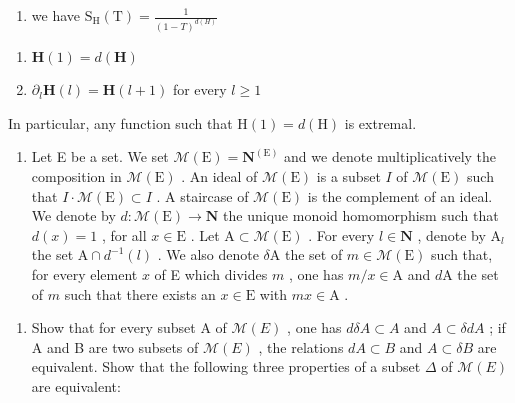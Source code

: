 \begin{enumerate}
\def\labelenumi{(\roman{enumi})}
\tightlist
\item
  we have \(\mathrm{S_H(T)} = \frac{1}{(1 - T)^{d(H)}}\)
\end{enumerate}

\begin{enumerate}
\def\labelenumi{(\roman{enumi})}
\setcounter{enumi}{1}
\item
  \(\mathbf{H}(1) = d(\mathbf{H})\)
\item
  \(\partial_{l}\mathbf{H}(l) = \mathbf{H}(l + 1)\) for every \(l\geqslant 1\)
\end{enumerate}

In particular, any function such that \(\mathrm{H}(1)=d(\mathrm{H})\) is extremal.

\begin{enumerate}
\def\labelenumi{\arabic{enumi})}
\setcounter{enumi}{7}
\tightlist
\item
  Let E be a set. We set \(\mathcal{M}(\mathrm{E}) = \mathbf{N}^{(\mathrm{E})}\) and we denote multiplicatively the composition in \(\mathcal{M}(\mathrm{E})\) . An ideal of \(\mathcal{M}(\mathrm{E})\) is a subset \(I\) of \(\mathcal{M}(\mathrm{E})\) such that \(I\cdot\mathcal{M}(\mathrm{E}) \subset I\) . A staircase of \(\mathcal{M}(\mathrm{E})\) is the complement of an ideal. We denote by \(d: \mathcal{M}(\mathrm{E}) \to \mathbf{N}\) the unique monoid homomorphism such that \(d(x) = 1\) , for all \(x \in \mathrm{E}\) . Let \(\mathrm{A} \subset \mathcal{M}(\mathrm{E})\) . For every \(l \in \mathbf{N}\) , denote by \(\mathrm{A}_l\) the set \(\mathrm{A} \cap d^{-1}(l)\) . We also denote \(\delta \mathrm{A}\) the set of \(m \in \mathcal{M}(\mathrm{E})\) such that, for every element \(x\) of E which divides \(m\) , one has \(m / x \in \mathrm{A}\) and \(d\mathrm{A}\) the set of \(m\) such that there exists an \(x \in \mathrm{E}\) with \(mx \in \mathrm{A}\) .
\end{enumerate}

\begin{enumerate}
\def\labelenumi{\alph{enumi})}
\tightlist
\item
  Show that for every subset A of \(\mathcal{M}(E)\) , one has \(d\delta A \subset A\) and \(A \subset \delta dA\) ; if A and B are two subsets of \(\mathcal{M}(E)\) , the relations \(dA \subset B\) and \(A \subset \delta B\) are equivalent. Show that the following three properties of a subset \(\Delta\) of \(\mathcal{M}(E)\) are equivalent:
\end{enumerate}

